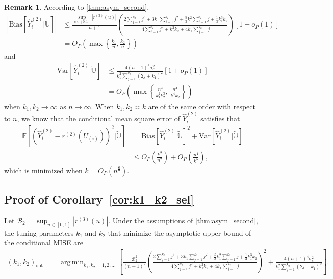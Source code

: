 \documentclass{uwstat572}
\theoremstyle{definition}
\newtheorem{Remark}{Remark}
\DeclareMathOperator*{\argmin}{arg\,min}
\renewcommand{\hat}{\widehat}
\renewcommand{\tilde}{\widetilde}
\theoremstyle{theorem}
\newenvironment{customcor}[1]
{\renewcommand\theinnercustomcor{#1}\innercustomcor}
{\endinnercustomcor}
\begin{document}
\begin{Remark}
\label{remark:MSE_second_deri}
According to \autoref{thm:asym_second}, 
\begin{align*}
\left|\mathrm{Bias}\left[\hat{Y}_i^{(2)} \big| \tilde{\mathbb{U}}\right] \right| &\leq \frac{\sup_{u\in [0,1]}\left|r^{(3)}(u)\right|}{n+1}  \left(\frac{2\sum_{j=1}^{k_2} j^3 + 3k_1 \sum_{j=1}^{k_2} j^2 + \frac{5}{3} k_1^2 \sum_{j=1}^{k_2}j + \frac{1}{3} k_1^3k_2}{4 \sum_{j=1}^{k_2}j^2 + k_1^2k_2 + 4k_1\sum_{j=1}^{k_2} j} \right)\left[1+o_P(1)\right]\\
&= O_P\left(\max\left\{\frac{k_1}{n}, \frac{k_2}{n} \right\} \right)
\end{align*}
and
\begin{align*}
\mathrm{Var}\left[\hat{Y}_i^{(2)} \big| \tilde{\mathbb{U}}\right] &\leq \frac{4(n+1)^4 \sigma_e^2}{k_1^2 \sum_{j=1}^{k_2} (2j+k_1)^2} \left[1+o_P(1)\right]\\
&=O_P\left(\max\left\{\frac{n^4}{k_1^2k_2^3},\, \frac{n^4}{k_1^4 k_2} \right\}\right)
\end{align*}
when $k_1,k_2 \to \infty$ as $n\to \infty$. When $k_1,k_2 \asymp k$ are of the same order with respect to $n$, we know that the conditional mean square error of $\hat{Y}_i^{(2)}$ satisfies that
\begin{align*}
\mathbb{E}\left[\left(\hat{Y}_i^{(2)} - r^{(2)}(U_{(i)})\right)^2 \big| \tilde{\mathbb{U}}\right] &= \mathrm{Bias}\left[\hat{Y}_i^{(2)} \big| \tilde{\mathbb{U}}\right]^2 + \mathrm{Var}\left[\hat{Y}_i^{(2)}|\tilde{\mathbb{U}}\right]\\
&\leq O_P\left(\frac{k^2}{n^2}\right) + O_P\left(\frac{n^4}{k^5}\right),
\end{align*}
which is minimized when $k=O_P\left(n^{\frac{6}{7}}\right)$.
\end{Remark}

\subsection{Proof of Corollary~\ref{cor:k1_k2_sel}}
\label{App:proof_cor6}

\begin{customcor}{6}[Corollary 5 in \citealt{liu2020smoothed}]
Let $\mathcal{B}_2=\sup_{u\in [0,1]} \left|r^{(3)}(u)\right|$. Under the assumptions of \autoref{thm:asym_second}, the tuning parameters $k_1$ and $k_2$ that minimize the asymptotic upper bound of the conditional MISE are
\begin{align*}
\left(k_1,k_2\right)_{\text{opt}} &= \argmin_{k_1,k_2=1,2,...} \left[\frac{\mathcal{B}_2^2}{(n+1)^2}  \left(\frac{2\sum\limits_{j=1}^{k_2} j^3 + 3k_1 \sum\limits_{j=1}^{k_2} j^2 + \frac{5}{3} k_1^2 \sum\limits_{j=1}^{k_2}j + \frac{1}{3} k_1^3k_2}{4 \sum_{j=1}^{k_2}j^2 + k_1^2k_2 + 4k_1\sum_{j=1}^{k_2} j} \right)^2 + \frac{4(n+1)^4\sigma_e^2}{k_1^2\sum\limits_{j=1}^{k_2} (2j+k_1)^2} \right].
\end{align*}
\end{customcor}
\end{document}

